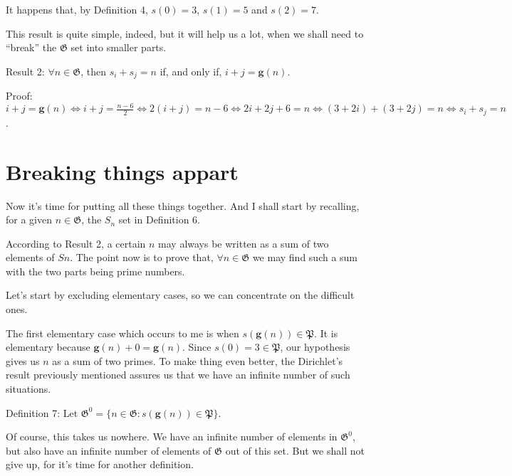 \documentclass[a4paper,12pt]{article}
\begin{document}
It happens that, by Definition 4, $s(0) = 3$, $s(1) = 5$ and $s(2) = 7$. \newline

This result is quite simple, indeed, but it will help us a lot, when we shall need to ``break'' the $\mathfrak{G}$ set into smaller parts. \newline

Result 2: $\forall n \in \mathfrak{G}$, then $s_i + s_j = n$ if, and only if, $i + j = \mathbf{g}(n)$.\newline

Proof: $i + j = \mathbf{g}(n) \Leftrightarrow i + j = \frac{n - 6}{2} \Leftrightarrow 2(i + j) = n - 6 \Leftrightarrow 2i + 2j + 6 = n \Leftrightarrow (3 + 2i) + (3 + 2j) = n \Leftrightarrow s_i + s_j = n$.

\section{Breaking things appart}

Now it's time for putting all these things together. And I shall start by recalling, for a given $n \in \mathfrak{G}$, the $S_n$ set in Definition 6.

According to Result 2, a certain $n$ may always be written as a sum of two elements of $Sn$. The point now is to prove that, $\forall n \in \mathfrak{G}$ we may find such a sum with the two parts being prime numbers.

Let's start by excluding elementary cases, so we can concentrate on the difficult ones.

The first elementary case which occurs to me is when $s(\mathbf{g}(n)) \in \mathfrak{P}$. It is elementary because $\mathbf{g}(n) + 0 = \mathbf{g}(n)$. Since $s(0) = 3 \in \mathfrak{P}$, our hypothesis gives us $n$ as a sum of two primes. To make thing even better, the Dirichlet's result previously mentioned assures us that we have an infinite number of such situations. \newline

Definition 7: Let $\mathfrak{G}^0 = \{ n \in \mathfrak{G}: s(\mathbf{g}(n)) \in \mathfrak{P} \}$. \newline

Of course, this takes us nowhere. We have an infinite number of elements in $\mathfrak{G}^0$, but also have an infinite number of elements of $\mathfrak{G}$ out of this set. But we shall not give up, for it's time for another definition. \newline
\end{document}
